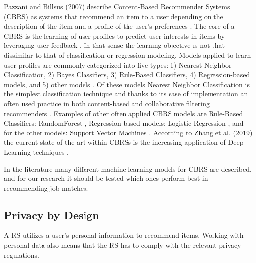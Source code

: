 Pazzani and Billsus (2007) describe Content-Based Recommender Systems (CBRS) as systems that recommend an item to a user depending on the description of the item and a profile of the user’s preferences \cite{pazzani2007content}.
The core of a CBRS is the learning of user profiles to predict user interests in items by leveraging user feedback \cite{aggarwal2016content}.
In that sense the learning objective is not that dissimilar to that of classification or regression modeling.
Models applied to learn user profiles are commonly categorized into five types: 1) Nearest Neighbor Classification, 2) Bayes Classifiers, 3) Rule-Based Classifiers, 4) Regression-based models, and 5) other models \cite{aggarwal2016content, pazzani2007content}.
Of these models Nearest Neighbor Classification is the simplest classification technique and thanks to its ease of implementation an often used practice in both content-based and collaborative filtering recommenders \cite{balabanovic1997fab}.
Examples of other often applied CBRS models  are Rule-Based Classifiers: RandomForest  \cite{zhang2016three, breiman2001random}, Regression-based models: Logistic Regression \cite{aggarwal2016content, hosmer2013applied}, and for the other models: Support Vector Machines \cite{aggarwal2016content, burges1998tutorial}.
According to Zhang et al. (2019) the current state-of-the-art within CBRSs is the increasing application of Deep Learning techniques \cite{zhang2019deep}.

In the literature many different machine learning models for CBRS are described, and for our research it should be tested which ones perform best in recommending job matches.


\subsection{Privacy by Design}
\label{sec:pbd}
A RS utilizes a user’s personal information to recommend items.
Working with personal data also means that the RS has to comply with the relevant privacy regulations.

